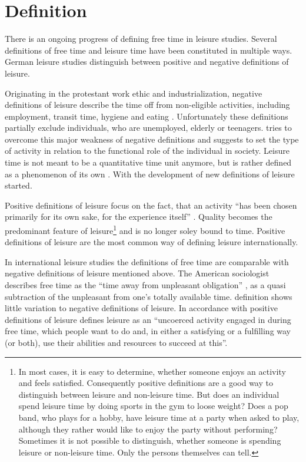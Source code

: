 \documentclass[12pt,numbers=noenddot,parskip,bibliography=totocnumbered,listof=totocnumbered,draft]{scrreprt}
\begin{document}
\section{Definition}

There is an ongoing progress of defining free time in leisure studies. Several definitions of free time and leisure time have been constituted in multiple ways. German leisure studies distinguish between positive and negative definitions of leisure. 

Originating in the protestant work ethic \citep[p.27]{weber2006} and industrialization, negative definitions of leisure describe the time off from non-eligible activities, including employment, transit time, hygiene and eating \citep[p.137]{prahl2002}. Unfortunately these definitions partially exclude individuals, who are unemployed, elderly or teenagers. \citeauthor{scheuch1972} tries to overcome this major weakness of negative definitions and suggests to set the type of activity in relation to the functional role of the individual in society. Leisure time is not meant to be a quantitative time unit anymore, but is rather defined as a phenomenon of its own \citep[p.31]{scheuch1972}. With \citeauthor{scheuch1972} the development of new definitions of leisure started.

Positive definitions of leisure focus on the fact, that an activity ``has been chosen primarily for its own sake, for the experience itself'' \citep[p.15]{freysinger2000}. Quality becomes the predominant feature of leisure\footnote{In most cases, it is easy to determine, whether someone enjoys an activity and feels satisfied. Consequently positive definitions are a good way to distinguish between leisure and non-leisure time. But does an individual spend leisure time by doing sports in the gym to loose weight? Does a pop band, who plays for a hobby, have leisure time at a party when asked to play, although they rather would like to enjoy the party without performing? Sometimes it is not possible to distinguish, whether someone is spending leisure or non-leisure time. Only the persons themselves can tell.} and is no longer soley bound to time. Positive definitions of leisure are the most common way of defining leisure internationally.

In international leisure studies the definitions of free time are comparable with negative definitions of leisure mentioned above. The American sociologist \citeauthor{stebbins2007} describes free time as the ``time away from unpleasant obligation'' \cite[p.4]{stebbins2007}, as a quasi subtraction of the unpleasant from one's totally available time. \citeauthor{stebbins2007} definition shows little variation to negative definitions of leisure. In accordance with positive definitions of leisure \citeauthor{stebbins2007} defines leisure as an ``uncoerced  activity engaged in during free time, which people want to do and, in either a satisfying or a fulfilling way (or both), use their abilities and resources to succeed at this''. 
\end{document}
